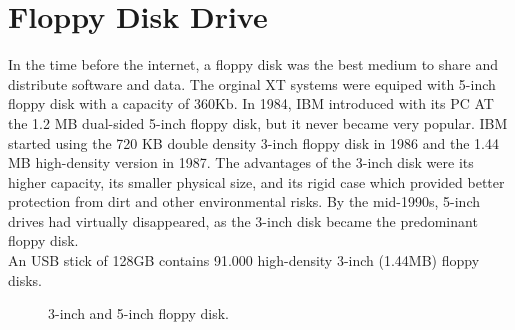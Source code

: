 \documentclass[book.tex]{subfiles}
\begin{document}
\section{Floppy Disk Drive}
In the time before the internet, a floppy disk was the best medium to share and distribute software and data. The orginal XT systems were equiped with 5-inch floppy disk with a capacity of 360Kb. In 1984, IBM introduced with its PC AT the 1.2 MB dual-sided 5-inch floppy disk, but it never became very popular. IBM started using the 720 KB double density 3-inch floppy disk in 1986 and the 1.44 MB high-density version in 1987. The advantages of the 3-inch disk were its higher capacity, its smaller physical size, and its rigid case which provided better protection from dirt and other environmental risks. By the mid-1990s, 5-inch drives had virtually disappeared, as the 3-inch disk became the predominant floppy disk. \\

\vspace{10pt}
 An USB stick of 128GB contains 91.000 high-density 3-inch (1.44MB) floppy disks.\\
\par

\begin{figure}

  \begin{minipage}{0.48\textwidth}
  \centering
  \end{minipage}
  \hfill
  \begin{minipage}{0.48\textwidth}
  \centering
  \end{minipage}
  \caption{3-inch and 5-inch floppy disk.}
  \end{figure}
\par
\end{document}
